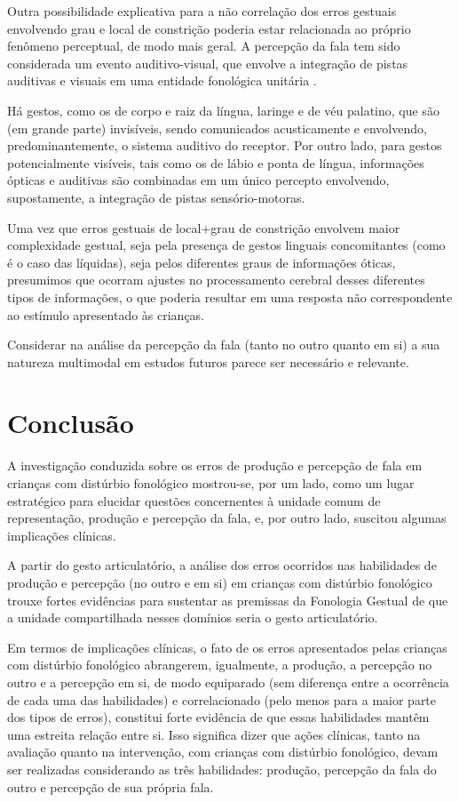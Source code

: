 \documentclass[output=paper,colorlinks,citecolor=brown,booklanguage=portuguese]{langscibook}
\begin{document}
Outra possibilidade explicativa para a não correlação dos erros gestuais envolvendo grau e local de constrição poderia estar relacionada ao próprio fenômeno perceptual, de modo mais geral. A percepção da fala tem sido considerada um evento auditivo-visual, que envolve a integração de pistas auditivas e visuais em uma entidade fonológica unitária \citep{Dodd2008}.

Há gestos, como os de corpo e raiz da língua, laringe e de véu palatino, que são (em grande parte) invisíveis, sendo comunicados acusticamente e envolvendo, predominantemente, o sistema auditivo do receptor. Por outro lado, para gestos potencialmente visíveis, tais como os de lábio e ponta de língua, informações ópticas e auditivas são combinadas em um único percepto envolvendo, supostamente, a integração de pistas sensório-motoras.

Uma vez que erros gestuais de local+grau de constrição envolvem maior complexidade gestual, seja pela presença de gestos linguais concomitantes (como é o caso das líquidas), seja pelos diferentes graus de informações óticas, presumimos que ocorram ajustes no processamento cerebral desses diferentes tipos de informações, o que poderia resultar em uma resposta não correspondente ao estímulo apresentado às crianças.

Considerar na análise da percepção da fala (tanto no outro quanto em si) a sua natureza multimodal em estudos futuros parece ser necessário e relevante.

\section{Conclusão}
A investigação conduzida sobre os erros de produção e percepção de fala em crianças com distúrbio fonológico mostrou-se, por um lado, como um lugar estratégico para elucidar questões concernentes à unidade comum de representação, produção e percepção da fala, e, por outro lado, suscitou algumas implicações clínicas.

A partir do gesto articulatório, a análise dos erros ocorridos nas habilidades de produção e percepção (no outro e em si) em crianças com distúrbio fonológico trouxe fortes evidências para sustentar as premissas da Fonologia Gestual de que a unidade compartilhada nesses domínios seria o gesto articulatório.

Em termos de implicações clínicas, o fato de os erros apresentados pelas crianças com distúrbio fonológico abrangerem, igualmente, a produção, a percepção no outro e a percepção em si, de modo equiparado (sem diferença entre a ocorrência de cada uma das habilidades) e correlacionado (pelo menos para a maior parte dos tipos de erros), constitui forte evidência de que essas habilidades mantêm uma estreita relação entre si. Isso significa dizer que ações clínicas, tanto na avaliação quanto na intervenção, com crianças com distúrbio fonológico, devam ser realizadas considerando as três habilidades: produção, percepção da fala do outro e percepção de sua própria fala.


{\sloppy\printbibliography[heading=subbibliography,notkeyword=this]}
\end{document}
